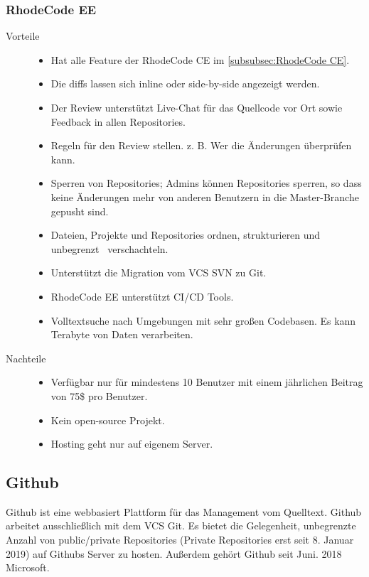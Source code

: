 \subsubsection{RhodeCode EE}
\label{subsubsec:RhodeCode EE}

\begin{description}
	\item [Vorteile] \hfill
		\begin{itemize}
			\item Hat alle Feature der RhodeCode CE im \cref{subsubsec:RhodeCode CE}.
			\item Die diffs lassen sich inline oder side-by-side angezeigt werden. 
			\item Der Review unterstützt Live-Chat für das Quellcode vor Ort sowie Feedback in allen Repositories.
			\item Regeln für den Review stellen. z. B. Wer die Änderungen überprüfen kann.
			\item Sperren von Repositories; Admins können Repositories sperren, so dass keine Änderungen mehr von anderen Benutzern in die Master-Branche gepusht sind.
			\item Dateien, Projekte und Repositories ordnen, strukturieren und unbegrenzt \, verschachteln.
			\item Unterstützt die Migration vom \ac{VCS} \ac{SVN} zu Git.
			\item RhodeCode EE unterstützt \ac{CI}/\ac{CD} Tools.
			\item Volltextsuche nach Umgebungen mit sehr großen Codebasen. Es kann Terabyte von Daten verarbeiten.
		\end{itemize}
	\item [Nachteile] \hfill
		\begin{itemize}
			\item Verfügbar nur für mindestens 10 Benutzer mit einem jährlichen Beitrag von 75\$ pro Benutzer.
			\item Kein open-source Projekt.
			\item Hosting geht nur auf eigenem Server.
		\end{itemize}
\end{description}


\subsection{Github}
\label{subsec:Github}

Github ist eine webbasiert Plattform für das Management vom Quelltext. Github arbeitet ausschließlich mit dem \ac{VCS} Git. Es bietet die Gelegenheit, unbegrenzte Anzahl von public/private Repositories (Private Repositories erst seit 8. Januar 2019) auf Githubs Server zu hosten. Außerdem gehört Github seit Juni. 2018 Microsoft.

